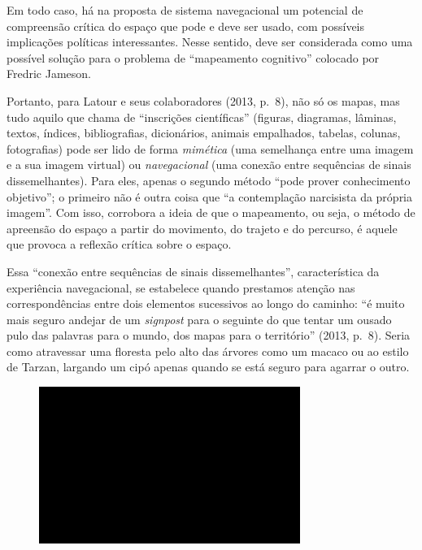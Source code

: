 Em todo caso, há na proposta de sistema navegacional um potencial de
compreensão crítica do espaço que pode e deve ser usado, com possíveis
implicações políticas interessantes. Nesse sentido, deve ser considerada
como uma possível solução para o problema de ``mapeamento cognitivo''
colocado por Fredric Jameson.

Portanto, para Latour e seus colaboradores (2013, p.~8), não só os
mapas, mas tudo aquilo que chama de ``inscrições científicas'' (figuras,
diagramas, lâminas, textos, índices, bibliografias, dicionários, animais
empalhados, tabelas, colunas, fotografias) pode ser lido de forma
\emph{mimética} (uma semelhança entre uma imagem e a sua imagem virtual)
ou \emph{navegacional} (uma conexão entre sequências de sinais
dissemelhantes). Para eles, apenas o segundo método ``pode prover
conhecimento objetivo''; o primeiro não é outra coisa que ``a
contemplação narcisista da própria imagem''. Com isso, corrobora a ideia
de que o mapeamento, ou seja, o método de apreensão do espaço a partir
do movimento, do trajeto e do percurso, é aquele que provoca a reflexão
crítica sobre o espaço.

Essa ``conexão entre sequências de sinais dissemelhantes'',
característica da experiência navegacional, se estabelece quando
prestamos atenção nas correspondências entre dois elementos sucessivos
ao longo do caminho: ``é muito mais seguro andejar de um \emph{signpost}
para o seguinte do que tentar um ousado pulo das palavras para o mundo,
dos mapas para o território'' (2013, p.~8). Seria como atravessar uma
floresta pelo alto das árvores como um macaco ou ao estilo de Tarzan,
largando um cipó apenas quando se está seguro para agarrar o outro.

\begin{figure}[!ht]
\centering
 \includegraphics[width=85mm]{./imgs/im1.jpg}
\caption{\tiny{}}
\end{figure}

